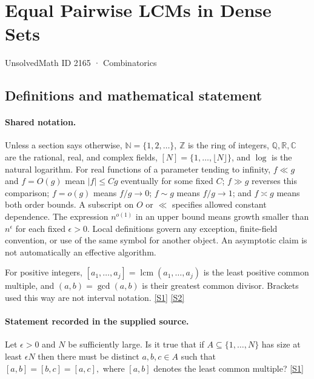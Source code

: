 \documentclass[11pt,a4paper]{article}
\newcommand{\N}{\mathbb{N}}
\newcommand{\Z}{\mathbb{Z}}
\newcommand{\Q}{\mathbb{Q}}
\newcommand{\R}{\mathbb{R}}
\newcommand{\C}{\mathbb{C}}
\newcommand{\sref}[2]{\hyperlink{source:#1:#2}{[S#2]}}
\begin{document}

\setcounter{section}{2164}

\section{Equal Pairwise LCMs in Dense Sets}\label{2165}

{\small\sffamily UnsolvedMath ID 2165 · Combinatorics}

\subsection{Definitions and mathematical statement}

\paragraph{Shared notation.}Unless a section says otherwise, $\N=\{1,2,\ldots\}$,
$\Z$ is the ring of integers, $\Q,\R,\C$ are the rational, real, and complex
fields, $[N]=\{1,\ldots,\lfloor N\rfloor\}$, and $\log$ is the natural
logarithm. For real functions of a parameter tending to infinity,
$f\ll g$ and $f=O(g)$ mean $|f|\leq Cg$ eventually for some fixed $C$;
$f\gg g$ reverses this comparison; $f=o(g)$ means $f/g\to0$;
$f\sim g$ means $f/g\to1$; and $f\asymp g$ means both order bounds.
A subscript on $O$ or $\ll$ specifies allowed constant dependence.
The expression $n^{o(1)}$ in an upper bound means growth smaller than
$n^\epsilon$ for each fixed $\epsilon>0$. Local definitions govern any
exception, finite-field convention, or use of the same symbol for another
object. An asymptotic claim is not automatically an effective algorithm.



For positive integers, $[a_1,\ldots,a_j]=\operatorname{lcm}(a_1,\ldots,a_j)$ is the least positive common multiple, and $(a,b)=\gcd(a,b)$ is their greatest common divisor. Brackets used this way are not interval notation. \sref{2165}{1} \sref{2165}{2}

\paragraph{Statement recorded in the supplied source.}
Let $\epsilon>0$ and $N$ be sufficiently large. Is it true that if $A\subseteq \{1,\ldots,N\}$ has size at least $\epsilon N$ then there must be distinct $a,b,c\in A$ such that $ [a,b]=[b,c]=[a,c], $ where $[a,b]$ denotes the least common multiple? \sref{2165}{1}
\end{document}
